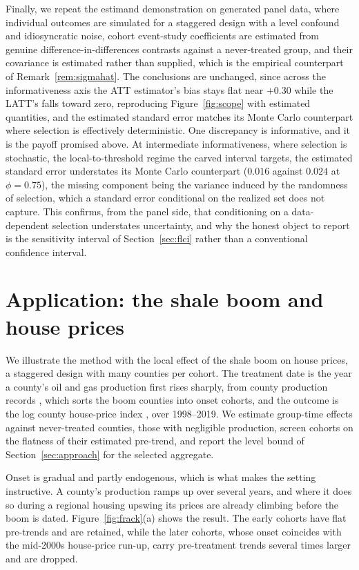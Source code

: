 \documentclass[12pt]{article}
\theoremstyle{remark}
\begin{document}
Finally, we repeat the estimand demonstration on generated panel data, where individual outcomes are
simulated for a staggered design with a level confound and idiosyncratic noise, cohort event-study
coefficients are estimated from genuine difference-in-differences contrasts against a never-treated
group, and their covariance is estimated rather than supplied, which is the empirical counterpart of
Remark~\ref{rem:sigmahat}. The conclusions are unchanged, since
across the informativeness axis the ATT estimator's bias stays flat near $+0.30$ while the LATT's falls
toward zero, reproducing Figure~\ref{fig:scope} with estimated quantities, and the estimated standard
error matches its Monte Carlo counterpart where selection is effectively deterministic. One discrepancy
is informative, and it is the payoff promised above. At intermediate informativeness, where selection is
stochastic, the local-to-threshold regime the carved interval targets, the estimated standard error
understates its Monte Carlo counterpart ($0.016$ against $0.024$ at $\phi=0.75$), the missing
component being the variance induced by the randomness of selection, which a standard error conditional
on the realized set does not capture. This confirms, from the panel side, that conditioning on a
data-dependent selection understates uncertainty, and why the honest object to report is the sensitivity
interval of Section~\ref{sec:flci} rather than a conventional confidence interval.

\section{Application: the shale boom and house prices}\label{sec:app}

We illustrate the method with the local effect of the shale boom on house prices, a staggered design
with many counties per cohort. The treatment date is the year a county's oil and gas production first
rises sharply, from county production records \citep{ers2015}, which sorts the boom counties into
onset cohorts, and the outcome is the log county house-price index \citep{bogin2019}, over 1998--2019. We
estimate \citet{callaway2021} group-time effects against never-treated counties, those with negligible
production, screen cohorts on the flatness of their estimated pre-trend, and report the level bound of
Section~\ref{sec:approach} for the selected aggregate.

Onset is gradual and partly endogenous, which is what makes the setting instructive. A county's
production ramps up over several years, and where it does so during a regional housing upswing its
prices are already climbing before the boom is dated. Figure~\ref{fig:frack}(a) shows the result. The
early cohorts have flat pre-trends and are retained, while the later cohorts, whose onset coincides
with the mid-2000s house-price run-up, carry pre-treatment trends several times larger and are dropped.
\end{document}
